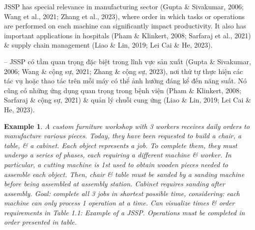 \documentclass{article}
\newtheorem{example}{Example}
\begin{document}
\begin{itemize}
    JSSP has special relevance in manufacturing sector (Gupta \& Sivakumar, 2006; Wang et al., 2021; Zhang et al., 2023), where order in which tasks or operations are performed on each machine can significantly impact productivity. It also has important applications in hospitals (Pham \& Klinkert, 2008; Sarfaraj et al., 2021) \& supply chain management (Liao \& Lin, 2019; Lei Cai \& He, 2023).

    -- JSSP có tầm quan trọng đặc biệt trong lĩnh vực sản xuất (Gupta \& Sivakumar, 2006; Wang \& cộng sự, 2021; Zhang \& cộng sự, 2023), nơi thứ tự thực hiện các tác vụ hoặc thao tác trên mỗi máy có thể ảnh hưởng đáng kể đến năng suất. Nó cũng có những ứng dụng quan trọng trong bệnh viện (Pham \& Klinkert, 2008; Sarfaraj \& cộng sự, 2021) \& quản lý chuỗi cung ứng (Liao \& Lin, 2019; Lei Cai \& He, 2023).

    \begin{example}
        A custom furniture workshop with 3 workers receives daily orders to manufacture various pieces. Today, they have been requested to build a chair, a table, \& a cabinet. Each object represents a job. To complete them, they must undergo a series of phases, each requiring a different machine \& worker. In particular, a cutting machine is 1st used to obtain wooden pieces needed to assemble each object. Then, chair \& table must be sanded by a sanding machine before being assembled at assembly station. Cabinet requires sanding after assembly. Goal: complete all 3 jobs in shortest possible time, considering: each machine can only process 1 operation at a time. Can visualize times \& order requirements in {\sf Table 1.1: Example of a JSSP. Operations must be completed in order presented in table}.


\end{example}
\end{itemize}
\end{document}
